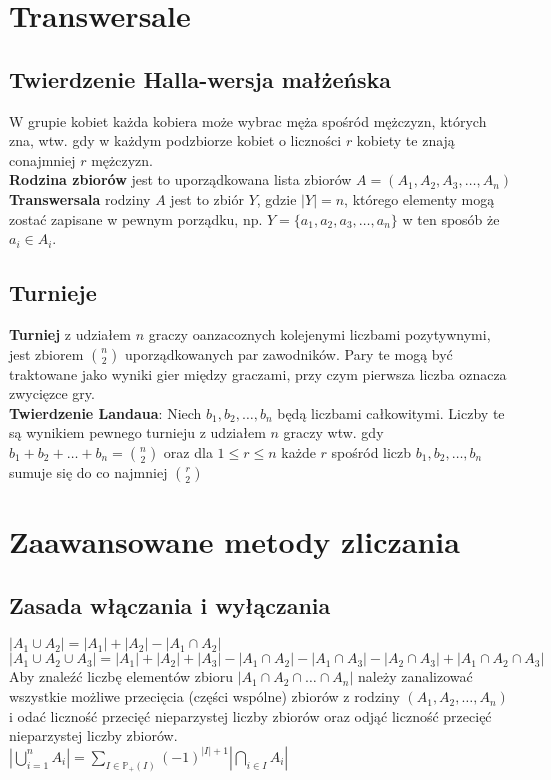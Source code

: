 \documentclass[a4paper,12pt]{article}
\begin{document}
\section{Transwersale}
\subsection{Twierdzenie Halla-wersja małżeńska}W grupie kobiet każda kobiera może wybrac męża spośród mężczyzn, których zna, wtw. gdy w każdym podzbiorze kobiet o liczności $r$ kobiety te znają conajmniej $r$ mężczyzn.\\
\textbf{Rodzina zbiorów} jest to uporządkowana lista zbiorów $A=(A_1,A_2,A_3,\hdots,A_n)$\\
\textbf{Transwersala} rodziny $A$ jest to zbiór $Y$, gdzie $|Y|=n$, którego elementy mogą zostać zapisane w pewnym porządku, np. $Y=\{ a_1, a_2, a_3,\hdots, a_n\}$ w ten sposób że $a_i\in A_i$.
\subsection{Turnieje}
\textbf{Turniej} z udziałem $n$ graczy oanzacoznych kolejenymi liczbami pozytywnymi, jest zbiorem $n\choose2$ uporządkowanych par zawodników. Pary te mogą być traktowane jako wyniki gier między graczami, przy czym pierwsza liczba oznacza zwycięzce gry.\\
\textbf{Twierdzenie Landaua}: Niech $b_1, b_2,\hdots,b_n$ będą liczbami całkowitymi. Liczby te są wynikiem pewnego turnieju z udziałem $n$ graczy wtw. gdy $b_1+b_2+\hdots+b_n={n\choose2}$ oraz dla $1\leq r \leq n$ każde $r$ spośród liczb $b_1, b_2,\hdots,b_n$ sumuje się do co najmniej $r\choose2$
\section{Zaawansowane metody zliczania}
\subsection{Zasada włączania i wyłączania}
	$|A_1\cup A_2| = |A_1| + |A_2| -|A_1\cap A_2|$ \\
	$|A_1\cup A_2\cup A_3| = |A_1| + |A_2| + |A_3|-|A_1\cap A_2| -|A_1\cap A_3| -|A_2\cap A_3|+ |A_1\cap A_2\cap A_3|$\\
	Aby znaleźć liczbę elementów zbioru $|A_1\cap A_2\cap \hdots \cap A_n|$ należy zanalizować wszystkie możliwe przecięcia (części wspólne) zbiorów z rodziny $(A_1, A_2, \dots ,A_n)$ i odać liczność przecięć nieparzystej liczby zbiorów oraz odjąć liczność przecięć nieparzystej liczby zbiorów.\\
	$\left| \bigcup\limits_{i=1}^n A_i\right|=\sum\limits_{I\in\mathbb{P}_+(I)} (-1)^{|I|+1} \left| \bigcap\limits_{i\in I} A_i \right|$
\end{document}
